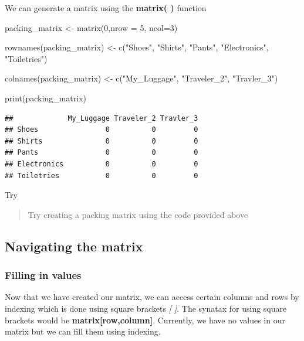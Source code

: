 \documentclass[
]{book}
\newenvironment{Shaded}{\begin{snugshade}}{\end{snugshade}}
\newcommand{\AttributeTok}[1]{\textcolor[rgb]{0.77,0.63,0.00}{#1}}
\newcommand{\DecValTok}[1]{\textcolor[rgb]{0.00,0.00,0.81}{#1}}
\newcommand{\FunctionTok}[1]{\textcolor[rgb]{0.00,0.00,0.00}{#1}}
\newcommand{\NormalTok}[1]{#1}
\newcommand{\OtherTok}[1]{\textcolor[rgb]{0.56,0.35,0.01}{#1}}
\newcommand{\StringTok}[1]{\textcolor[rgb]{0.31,0.60,0.02}{#1}}
\begin{document}
We can generate a matrix using the \textbf{matrix( )} function

\begin{Shaded}
\begin{Highlighting}[]
\NormalTok{packing\_matrix }\OtherTok{\textless{}{-}} \FunctionTok{matrix}\NormalTok{(}\DecValTok{0}\NormalTok{,}\AttributeTok{nrow =} \DecValTok{5}\NormalTok{, }\AttributeTok{ncol=}\DecValTok{3}\NormalTok{)}

\FunctionTok{rownames}\NormalTok{(packing\_matrix) }\OtherTok{\textless{}{-}} \FunctionTok{c}\NormalTok{(}\StringTok{"Shoes"}\NormalTok{, }\StringTok{"Shirts"}\NormalTok{, }\StringTok{"Pants"}\NormalTok{, }\StringTok{"Electronics"}\NormalTok{, }\StringTok{"Toiletries"}\NormalTok{)}

\FunctionTok{colnames}\NormalTok{(packing\_matrix) }\OtherTok{\textless{}{-}} \FunctionTok{c}\NormalTok{(}\StringTok{"My\_Luggage"}\NormalTok{, }\StringTok{"Traveler\_2"}\NormalTok{, }\StringTok{"Travler\_3"}\NormalTok{)}

\FunctionTok{print}\NormalTok{(packing\_matrix)}
\end{Highlighting}
\end{Shaded}

\begin{verbatim}
##             My_Luggage Traveler_2 Travler_3
## Shoes                0          0         0
## Shirts               0          0         0
## Pants                0          0         0
## Electronics          0          0         0
## Toiletries           0          0         0
\end{verbatim}

Try

\begin{quote}
Try creating a packing matrix using the code provided above
\end{quote}

\hypertarget{navigating-the-matrix}{%
\subsection{Navigating the matrix}\label{navigating-the-matrix}}

\hypertarget{filling-in-values}{%
\subsubsection{Filling in values}\label{filling-in-values}}

Now that we have created our matrix, we can access certain columns and rows by indexing which is done using square brackets \emph{{[} {]}}. The synatax for using square brackets would be \textbf{matrix{[}row,column{]}}. Currently, we have no values in our matrix but we can fill them using indexing.
\end{document}
